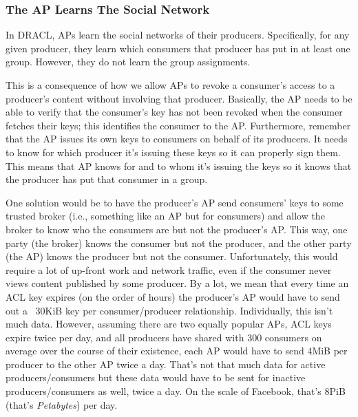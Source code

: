\documentclass[pdftex,12pt,a4papaer,twoside,notitlepage]{report}
\begin{document}
\subsubsection{The AP Learns The Social Network}
\label{sec:ap_learns_network}

In DRACL, APs learn the social networks of their producers. Specifically,
for any given producer, they learn which consumers that producer has put in at
least one group. However, they do not learn the group assignments.

This is a consequence of how we allow APs to revoke a consumer's access to a
producer's content without involving that producer. Basically, the AP needs to
be able to verify that the consumer's key has not been revoked when the consumer
fetches their keys; this identifies the consumer to the AP. Furthermore,
remember that the AP issues its own keys to consumers on behalf of its
producers. It needs to know for which producer it's issuing these keys so it can
properly sign them. This means that AP knows for and to whom it's issuing the
keys so it knows that the producer has put that consumer in a group.

One solution would be to have the producer's AP send consumers' keys to some
trusted broker (i.e., something like an AP but for consumers) and allow the
broker to know who the consumers are but not the producer's AP. This way, one
party (the broker) knows the consumer but not the producer, and the other party
(the AP) knows the producer but not the consumer. Unfortunately, this would
require a lot of up-front work and network traffic, even if the consumer never
views content published by some producer. By a lot, we mean that every time an
ACL key expires (on the order of hours) the producer's AP would have to send out
a ~30KiB key per consumer/producer relationship. Individually, this isn't much
data. However, assuming there are two equally popular APs, ACL keys expire twice
per day, and all producers have shared with 300 consumers on average over the
course of their existence, each AP would have to send 4MiB per producer to the
other AP twice a day. That's not that much data for active producers/consumers
but these data would have to be sent for inactive producers/consumers as well,
twice a day. On the scale of Facebook, that's 8PiB (that's \emph{Petabytes}) per
day.
\end{document}
